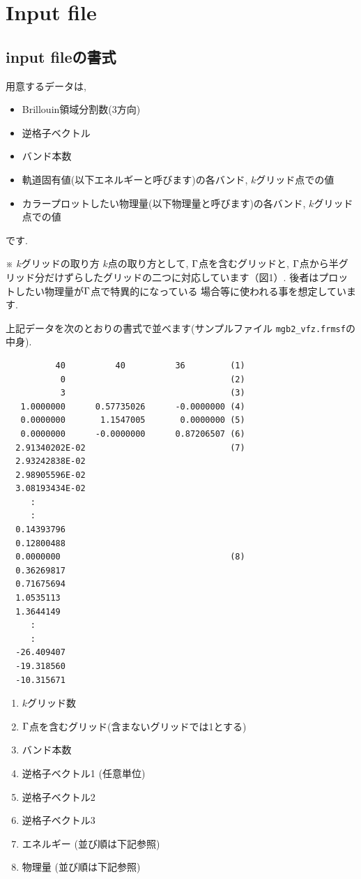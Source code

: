\documentclass[12pt]{jarticle}
\begin{document}
\section{Input file}

\subsection{input fileの書式}

用意するデータは, 
\begin{itemize}
\item Brillouin領域分割数(3方向)
\item 逆格子ベクトル
\item バンド本数
\item 軌道固有値(以下エネルギーと呼びます)の各バンド, $k$グリッド点での値
\item カラープロットしたい物理量(以下物理量と呼びます)の各バンド, $k$グリッド点での値
\end{itemize}
です. 

※ $k$グリッドの取り方
$k$点の取り方として, ${\rm \Gamma}$点を含むグリッドと, 
${\rm \Gamma}$点から半グリッド分だけずらしたグリッドの二つに対応しています（図1）. 
後者はプロットしたい物理量が${\rm \Gamma}$点で特異的になっている
場合等に使われる事を想定しています. 

上記データを次のとおりの書式で並べます(サンプルファイル \verb|mgb2_vfz.frmsf|の中身). 

\begin{verbatim}
          40          40          36         (1)
           0                                 (2)
           3                                 (3)
   1.0000000      0.57735026      -0.0000000 (4)
   0.0000000       1.1547005       0.0000000 (5)
   0.0000000      -0.0000000      0.87206507 (6)
  2.91340202E-02                             (7)
  2.93242838E-02
  2.98905596E-02
  3.08193434E-02
     :
     :
  0.14393796
  0.12800488
  0.0000000                                  (8)
  0.36269817
  0.71675694
  1.0535113
  1.3644149
     :
     :
  -26.409407
  -19.318560
  -10.315671
\end{verbatim}

\begin{enumerate}
  \renewcommand{\labelenumi}{(\arabic{enumi})}
  \item $k$グリッド数
  \item ${\rm \Gamma}$点を含むグリッド(含まないグリッドでは1とする)
  \item バンド本数
  \item 逆格子ベクトル1 (任意単位)
  \item 逆格子ベクトル2
  \item 逆格子ベクトル3
  \item エネルギー (並び順は下記参照)
  \item 物理量 (並び順は下記参照)
\end{enumerate}
\end{document}
